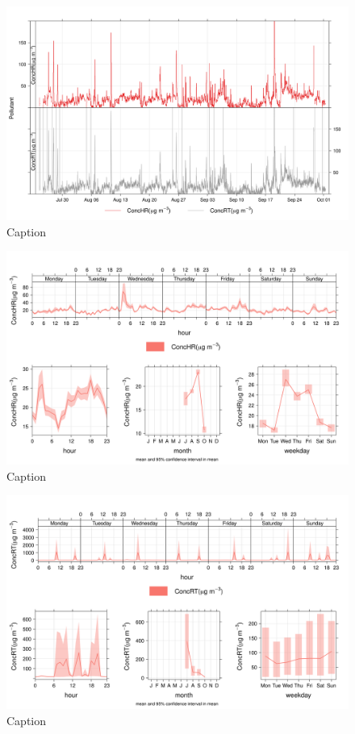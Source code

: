 \documentclass{nwureport}
\begin{document}
\begin{figure}[!htb]
    \centering
    \includegraphics[width=\textwidth]{images/conc_timplt_25.png}
    \caption{Caption}
    \label{fig:pm2.5conc_timeplot}
\end{figure}

\begin{figure}[!htb]
    \centering
    \includegraphics[width=\textwidth]{images/conc_HR_25.png}
    \caption{Caption}
    \label{fig:pm2.5conc_HR}
\end{figure}

\begin{figure}[!htb]
    \centering
    \includegraphics[width=\textwidth]{images/conc_RT_25.png}
    \caption{Caption}
    \label{fig:pm2.5conc_RT}
\end{figure}
\end{document}
